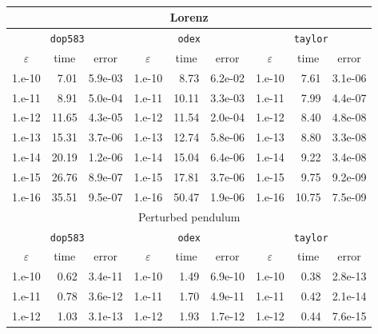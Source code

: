 \documentclass[12pt,twoside]{article}
\begin{document}
\begin{table}
\begin{center}
{\tt
\begin{tabular}{|r|r|r||r|r|r||r|r|r|}\hline
\multicolumn{9}{|c|}{\textrm{Lorenz}} \\ \hline
\multicolumn{3}{|c||}{\texttt{dop583}} &
\multicolumn{3}{c||}{\texttt{odex}} &
\multicolumn{3}{c|}{\texttt{taylor}} \\ \hline
\multicolumn{1}{|c|}{$\varepsilon$} &
\multicolumn{1}{|c|}{\textrm{time}} &
\multicolumn{1}{|c||}{\textrm{error}} &
\multicolumn{1}{|c|}{$\varepsilon$} &
\multicolumn{1}{|c|}{\textrm{time}} &
\multicolumn{1}{|c||}{\textrm{error}} &
\multicolumn{1}{|c|}{$\varepsilon$} &
\multicolumn{1}{|c|}{\textrm{time}} &
\multicolumn{1}{|c|}{\textrm{error}}\\ \hline
1.e-10 &  7.01 & 5.9e-03 & 1.e-10 &  8.73 & 6.2e-02 & 1.e-10 & 7.61 & 3.1e-06\\
1.e-11 &  8.91 & 5.0e-04 & 1.e-11 & 10.11 & 3.3e-03 & 1.e-11 & 7.99 & 4.4e-07\\
1.e-12 & 11.65 & 4.3e-05 & 1.e-12 & 11.54 & 2.0e-04 & 1.e-12 & 8.40 & 4.8e-08\\
1.e-13 & 15.31 & 3.7e-06 & 1.e-13 & 12.74 & 5.8e-06 & 1.e-13 & 8.80 & 3.3e-08\\
1.e-14 & 20.19 & 1.2e-06 & 1.e-14 & 15.04 & 6.4e-06 & 1.e-14 & 9.22 & 3.4e-08\\
1.e-15 & 26.76 & 8.9e-07 & 1.e-15 & 17.81 & 3.7e-06 & 1.e-15 & 9.75 & 9.2e-09\\
1.e-16 & 35.51 & 9.5e-07 & 1.e-16 & 50.47 & 1.9e-06 & 1.e-16 &10.75 & 7.5e-09\\
\hline\hline
\multicolumn{9}{|c|}{\textrm{Perturbed pendulum}} \\ \hline
\multicolumn{3}{|c||}{\texttt{dop583}} &
\multicolumn{3}{c||}{\texttt{odex}} &
\multicolumn{3}{c|}{\texttt{taylor}} \\ \hline
\multicolumn{1}{|c|}{$\varepsilon$} &
\multicolumn{1}{|c|}{\textrm{time}} &
\multicolumn{1}{|c||}{\textrm{error}} &
\multicolumn{1}{|c|}{$\varepsilon$} &
\multicolumn{1}{|c|}{\textrm{time}} &
\multicolumn{1}{|c||}{\textrm{error}} &
\multicolumn{1}{|c|}{$\varepsilon$} &
\multicolumn{1}{|c|}{\textrm{time}} &
\multicolumn{1}{|c|}{\textrm{error}}\\ \hline
1.e-10 & 0.62 & 3.4e-11 & 1.e-10 & 1.49 & 6.9e-10 & 1.e-10 & 0.38 & 2.8e-13\\
1.e-11 & 0.78 & 3.6e-12 & 1.e-11 & 1.70 & 4.9e-11 & 1.e-11 & 0.42 & 2.1e-14\\
1.e-12 & 1.03 & 3.1e-13 & 1.e-12 & 1.93 & 1.7e-12 & 1.e-12 & 0.44 & 7.6e-15\\

\end{tabular}}
\end{center}
\end{table}
\end{document}

